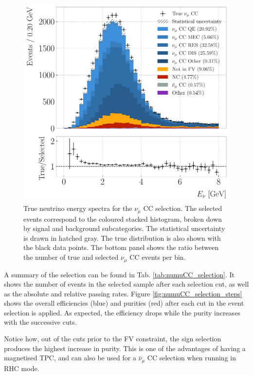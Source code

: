 \begin{figure}[t]
	\centering
	\includegraphics[width=.80\linewidth]{Images/GAr_selection/numuCC_selection_true_energy.pdf}
	\caption[True neutrino energy spectra for the $\nu_{\mu}$ CC selection.]{True neutrino energy spectra for the $\nu_{\mu}$ CC selection. The selected events correspond to the coloured stacked histogram, broken down by signal and background subcategories. The statistical uncertainty is drawn in hatched gray. The true distribution is also shown with the black data points. The bottom panel shows the ratio between the number of true and selected $\nu_{\mu}$ CC events per bin.}
	\label{fig:numuCC_selection_true_enu}
\end{figure}

A summary of the selection can be found in Tab. \ref{tab:numuCC_selection}. It shows the number of events in the selected sample after each selection cut, as well as the absolute and relative passing rates. Figure \ref{fig:numuCC_selection_steps} shows the overall efficiencies (blue) and purities (red) after each cut in the event selection is applied. As expected, the efficiency drops while the purity increases with the successive cuts.

Notice how, out of the cuts prior to the FV constraint, the sign selection produces the highest increase in purity. This is one of the advantages of having a magnetised TPC, and can also be used for a $\bar{\nu}_{\mu}$ CC selection when running in RHC mode.

